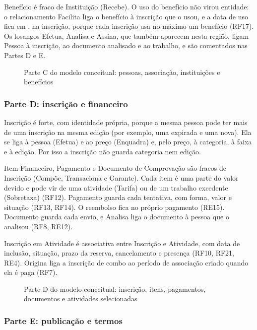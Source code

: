 Benefício é fraco de Instituição (Recebe). O uso do benefício não virou entidade: o relacionamento Facilita liga o benefício à inscrição que o usou, e a data de uso fica em , na inscrição, porque cada inscrição usa no máximo um benefício (RF17). Os losangos Efetua, Analisa e Assina, que também aparecem nesta região, ligam Pessoa à inscrição, ao documento analisado e ao trabalho, e são comentados nas Partes D e E.

\begin{figure}[h!]
\centering
\merC
\caption{Parte C do modelo conceitual: pessoas, associação, instituições e benefícios}
\label{fig:merC}
\end{figure}

\subsubsection*{Parte D: inscrição e financeiro}

Inscrição é forte, com identidade própria, porque a mesma pessoa pode ter mais de uma inscrição na mesma edição (por exemplo, uma expirada e uma nova). Ela se liga à pessoa (Efetua) e ao preço (Enquadra) e, pelo preço, à categoria, à faixa e à edição. Por isso a inscrição não guarda categoria nem edição.

Item Financeiro, Pagamento e Documento de Comprovação são fracos de Inscrição (Compõe, Transaciona e Garante). Cada item é uma parte do valor devido e pode vir de uma atividade (Tarifa) ou de um trabalho excedente (Sobretaxa) (RF12). Pagamento guarda cada tentativa, com forma, valor e situação (RF13, RF14). O reembolso fica no próprio pagamento (RE15). Documento guarda cada envio, e Analisa liga o documento à pessoa que o analisou (RF8, RE12).

Inscrição em Atividade é associativa entre Inscrição e Atividade, com data de inclusão, situação, prazo da reserva, cancelamento e presença (RF10, RF21, RE4). Origina liga a inscrição de combo ao período de associação criado quando ela é paga (RF7).

\begin{figure}[h!]
\centering
\merD
\caption{Parte D do modelo conceitual: inscrição, itens, pagamentos, documentos e atividades selecionadas}
\label{fig:merD}
\end{figure}

\subsubsection*{Parte E: publicação e termos}

